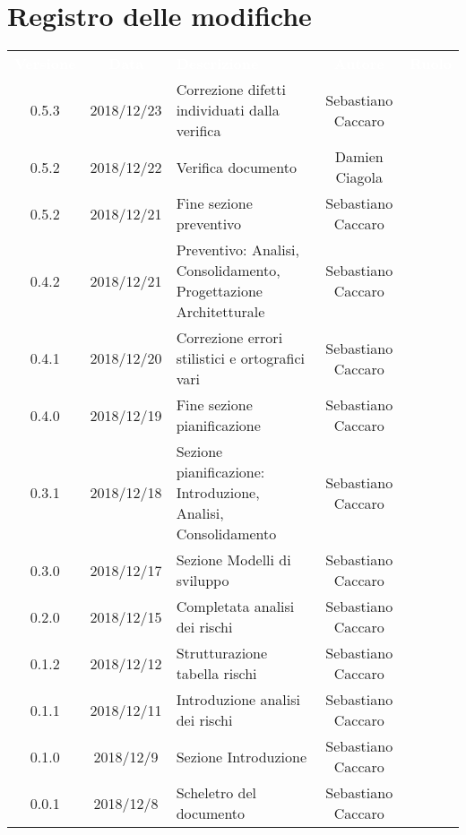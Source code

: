 
\section*{Registro delle modifiche}
{
	\renewcommand{\arraystretch}{1.5}
	\centering
	\begin{longtable}{ c c  C{4cm}  c  c }
		
		\textcolor{white}{\textbf{Versione}} & \textcolor{white}{\textbf{Data}} & \textcolor{white}{\textbf{Descrizione}} & \textcolor{white}{\textbf{Autore}} & \textcolor{white}{\textbf{Ruolo}}\\
		0.5.3 & 2018/12/23 & Correzione difetti individuati dalla verifica & Sebastiano Caccaro & \Res{}\\		
		
		0.5.2 & 2018/12/22 & Verifica documento & Damien Ciagola & \ver{}\\
		
		0.5.2 & 2018/12/21 & Fine sezione preventivo & Sebastiano Caccaro & \Res{}\\
		
		0.4.2 & 2018/12/21 & Preventivo: Analisi, Consolidamento, Progettazione Architetturale & Sebastiano Caccaro & \Res{}\\
		
		0.4.1 & 2018/12/20 & Correzione errori stilistici e ortografici vari & Sebastiano Caccaro & \Res{}\\
		
		0.4.0 & 2018/12/19 & Fine sezione pianificazione & Sebastiano Caccaro & \Res{}\\
		
		0.3.1 & 2018/12/18 & Sezione pianificazione: Introduzione, Analisi, Consolidamento & Sebastiano Caccaro & \Res{}\\
		
		0.3.0 & 2018/12/17 & Sezione Modelli di sviluppo & Sebastiano Caccaro & \Res{}\\
				
		0.2.0 & 2018/12/15 & Completata analisi dei rischi & Sebastiano Caccaro & \Res{}\\
				
		0.1.2 & 2018/12/12 & Strutturazione tabella rischi & Sebastiano Caccaro & \Res{}\\
				
		0.1.1 & 2018/12/11 & Introduzione analisi dei rischi & Sebastiano Caccaro & \Res{}\\
				
		0.1.0 & 2018/12/9 & Sezione Introduzione & Sebastiano Caccaro & \Res{}\\
		
		0.0.1 & 2018/12/8 & Scheletro del documento & Sebastiano Caccaro & \Res{}\\
		
	\end{longtable}

}